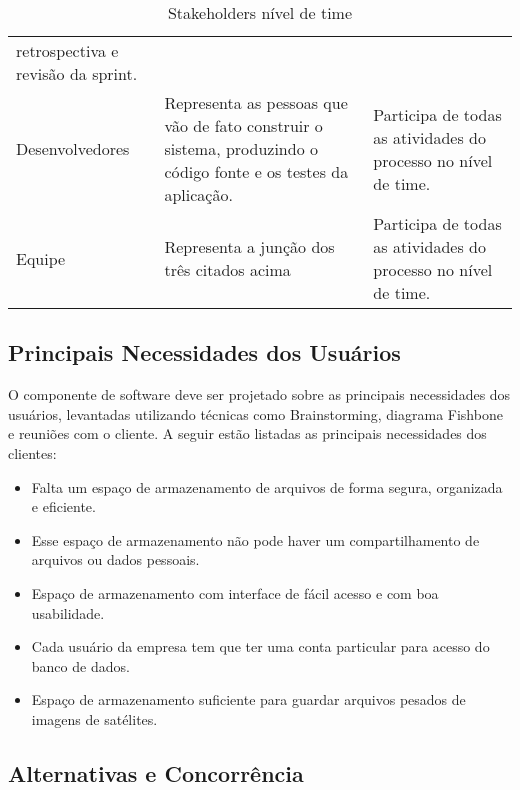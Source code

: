 \begin{table}[!htb]
\begin{tabular}{p{}p{6cm}p{6cm}}
                                                                                              retrospectiva e revisão da sprint.            \\
        Desenvolvedores                  & Representa as pessoas que vão de fato construir
                                           o sistema, produzindo o código fonte e os testes
                                           da aplicação.                                    & Participa de todas as atividades do processo
                                                                                              no nível de time.                             \\
        Equipe                           & Representa a junção dos três citados acima       & Participa de todas as atividades do processo
                                                                                              no nível de time.
    \end{tabular}
    \caption{Stakeholders nível de time}
  \end{table}

\subsection{Principais Necessidades dos Usuários}

  O componente de software deve ser projetado sobre as principais necessidades dos usuários, levantadas utilizando técnicas como Brainstorming,
  diagrama Fishbone e reuniões com o cliente. A seguir estão listadas as principais necessidades dos clientes:

  \begin{itemize}
    \item Falta um espaço de armazenamento de arquivos de forma segura, organizada e eficiente.
    \item Esse espaço de armazenamento não pode haver um compartilhamento de arquivos ou dados pessoais.
    \item Espaço de armazenamento com interface de fácil acesso e com boa usabilidade.
    \item Cada usuário da empresa tem que ter uma conta particular para acesso do banco de dados.
    \item Espaço de armazenamento suficiente para guardar arquivos pesados de imagens de satélites.
  \end{itemize}

\subsection{Alternativas e Concorrência}

